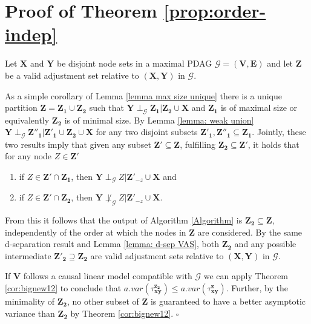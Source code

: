 \documentclass[11pt,a4paper]{article}
\theoremstyle{definition}
\theoremstyle{remark}
\newenvironment{proofof}[1][]{\begin{trivlist}
\item[\hskip \labelsep {\textit{Proof of #1.}}]}{\hfill{}$\square$\end{trivlist}}
\newcommand{\mpdag}{maximal PDAG}
\newcommand{\g}[1][G]{\mathcal{#1}}
\begin{document}
\section{Proof of Theorem \ref{prop:order-indep}}

\label{section-D}

\begin{proofof}[Theorem \ref{prop:order-indep}]
	Let $\mathbf{X}$ and $\mathbf{Y}$ be disjoint node sets in a \mpdag{} $\g = (\mathbf{V},\mathbf{E})$ and let $\mathbf{Z}$ be a valid adjustment set relative to $(\mathbf{X,Y})$ in $\g$. 
	
	
	
	
	As a simple corollary of Lemma \ref{lemma max size unique} there is a unique partition $\mathbf{Z}=\mathbf{Z_1} \cup \mathbf{Z_2}$ such that $\mathbf{Y} \perp_{\g} \mathbf{Z_1} | \mathbf{Z_2} \cup \mathbf{X}$ and $\mathbf{Z_1}$ is of maximal size or equivalently $\mathbf{Z_2}$ is of minimal size. 
	By Lemma \ref{lemma: weak union} $\mathbf{Y} \perp_{\g} \mathbf{Z''_1} | \mathbf{Z'_1} \cup \mathbf{Z_2} \cup \mathbf{X}$ for any two disjoint subsets $\mathbf{Z'_1}, \mathbf{Z''_1} \subseteq \mathbf{Z_1}$. 
	Jointly, these two results imply that given any subset $\mathbf{Z'} \subseteq \mathbf{Z}$, fulfilling $\mathbf{Z_2} \subseteq \mathbf{Z'}$, it holds that for any node $Z \in \mathbf{Z'}$
	\begin{enumerate}
		\item if $Z \in \mathbf{Z'} \cap \mathbf{Z_1}$, then $\mathbf{Y} \perp_{\g} Z | \mathbf{Z'}_{-z} \cup \mathbf{X}$ and 
		\item if $Z \in \mathbf{Z'} \cap \mathbf{Z_2}$, then $\mathbf{Y} \not\perp_{\g} Z | \mathbf{Z'}_{-z} \cup \mathbf{X}$.
	\end{enumerate} 
 	From this it follows that the output of Algorithm \ref{Algorithm} is $\mathbf{Z_2} \subseteq \mathbf{Z}$, independently of the order at which the nodes in $\mathbf{Z}$ are considered. By the same d-separation result and Lemma \ref{lemma: d-sep VAS}, both $\mathbf{Z_2}$ and any possible intermediate $\mathbf{Z'_2} \supseteq \mathbf{Z_2}$ are valid adjustment sets relative to $(\mathbf{X},\mathbf{Y})$ in $\g$. 
	
	
	If $\mathbf{V}$ follows a causal linear model compatible with $\g$ we can apply Theorem \ref{cor:bignew12} to conclude that 
	$a.var(\tau^{\mathbf{z_2}}_{\mathbf{xy}}) \leq a.var(\tau^{\mathbf{z}}_{\mathbf{xy}})$. Further, by the minimality of $\mathbf{Z_2}$, no other subset of $\mathbf{Z}$ is guaranteed to have a better asymptotic variance than $\mathbf{Z_2}$ by Theorem \ref{cor:bignew12}.
\end{proofof}
\end{document}
